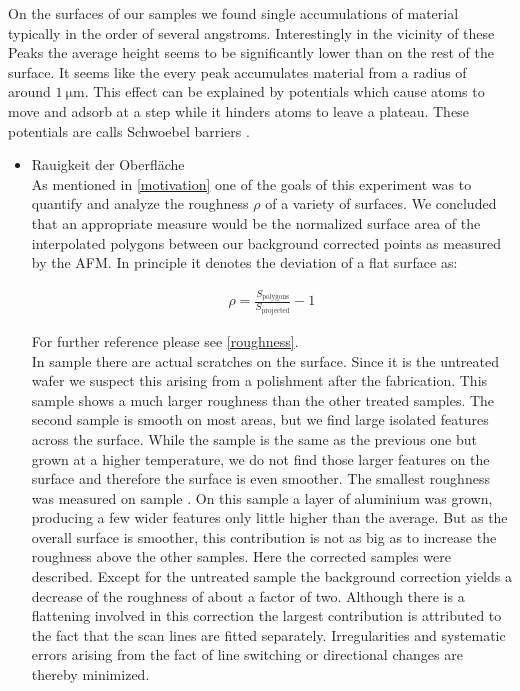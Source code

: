 \documentclass[paper=a4,fontsize=10pt,DIV=18,twocolumn,parskip=half]{scrartcl}
\numberwithin{equation}{section}    %
\begin{document}
On the surfaces of our samples we found single accumulations of material typically in the order of several angstroms. Interestingly in the vicinity of these Peaks the average height seems to be significantly lower than on the rest of the surface. It seems like the every peak accumulates material from a radius of around $\SI{1}{\micro\meter}$. This effect can be explained by potentials which cause atoms to move and adsorb at a step while it hinders atoms to leave a plateau. These potentials are calls Schwoebel barriers \cite{merikoski}.
\begin{itemize}
\item Rauigkeit der Oberfläche\\

As mentioned in \cref{motivation} one of the goals of this experiment was to 
quantify and analyze the roughness $\rho$ of a variety of surfaces. We concluded 
that an appropriate measure would be the normalized surface area of the 
interpolated polygons between our background corrected points as measured by the 
AFM. In principle it denotes the deviation of a flat surface as:

\begin{align}
    \rho = \frac{S_{\text{polygons}}}{S_{\text{projected}}} - 1
\end{align}

For further reference please see \cref{roughness}.  \\
In sample  there are actual scratches on the surface. Since it is the 
untreated wafer we suspect this arising from a polishment after the fabrication. 
This sample shows a much larger roughness than the other treated samples. The 
second sample  is smooth on most areas, but we find large isolated 
features across the surface. While the sample  is the same as the 
previous one but grown at a higher temperature, we do not find those larger 
features on the surface and therefore the surface is even smoother. The smallest 
roughness was measured on sample . On this sample a layer of 
aluminium was grown, producing a few wider features only little higher than the 
average. But as the overall surface is smoother, this contribution is not as big 
as to increase the roughness above the other samples. Here the corrected samples 
were described. Except for the untreated sample  the background 
correction yields a decrease of the roughness of about a factor of two. Although 
there is a flattening involved in this correction the largest contribution is 
attributed to the fact that the scan lines are fitted separately. Irregularities 
and systematic errors arising from the fact of line switching or directional 
changes are thereby minimized. 

\end{itemize}
\end{document}
